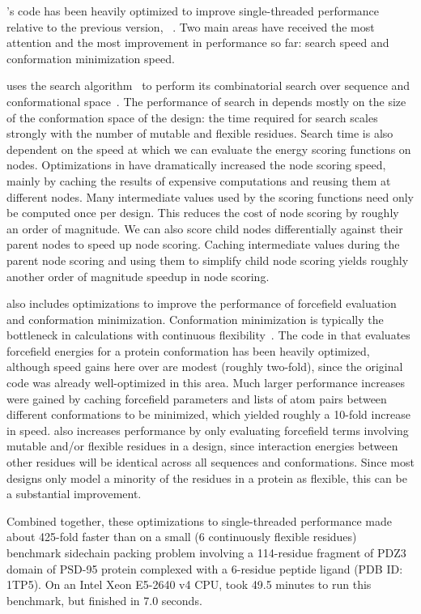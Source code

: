 's code has been heavily optimized to improve single-threaded performance relative to the previous version, ~\cite{COMETS}. Two main areas have received the most attention and the most improvement in performance so far: \as search speed and conformation minimization speed.

\osprey uses the \as search algorithm~\cite{DEE/A*} to perform its combinatorial search over sequence and conformational space~\cite{minDEE,iMinDEE,DEEPer}.  The performance of \as search in \osprey depends mostly on the size of the conformation space of the design: the time required for search scales strongly with the number of mutable and flexible residues. Search time is also dependent on the speed at which we can evaluate the energy scoring functions on \as nodes. Optimizations in  have dramatically increased the \as node scoring speed, mainly by caching the results of expensive computations and reusing them at different nodes. Many intermediate values used by the \as scoring functions need only be computed once per design. This reduces the cost of node scoring by roughly an order of magnitude. We can also score child nodes differentially against their parent nodes to speed up node scoring. Caching intermediate values during the parent node scoring and using them to simplify child node scoring yields roughly another order of magnitude speedup in \as node scoring. %

 also includes optimizations to improve the performance of forcefield evaluation and conformation minimization. Conformation minimization is typically the bottleneck in \osprey calculations with continuous flexibility~\cite{minDEE,iMinDEE,DEEPer,CATS}.  The code in  that evaluates forcefield energies for a protein conformation has been heavily optimized, although speed gains here over  are modest (roughly two-fold), since the original code was already well-optimized in this area. Much larger performance increases were gained by caching forcefield parameters and lists of atom pairs between different conformations to be minimized, which yielded roughly a 10-fold increase in speed.  also increases performance by only evaluating forcefield terms involving mutable and/or flexible residues in a design, since interaction energies between other residues will be identical across all sequences and conformations.  Since most designs only model a minority of the residues in a protein as flexible, this can be a substantial improvement. 

Combined together, these optimizations to single-threaded performance made  about 425-fold faster than  on a small (6 continuously flexible residues) benchmark sidechain packing problem involving a 114-residue fragment of PDZ3 domain of PSD-95 protein complexed with a 6-residue peptide ligand (PDB ID: 1TP5).  On an Intel Xeon E5-2640 v4 CPU,  took 49.5 minutes to run this benchmark, but  finished in 7.0 seconds.  
